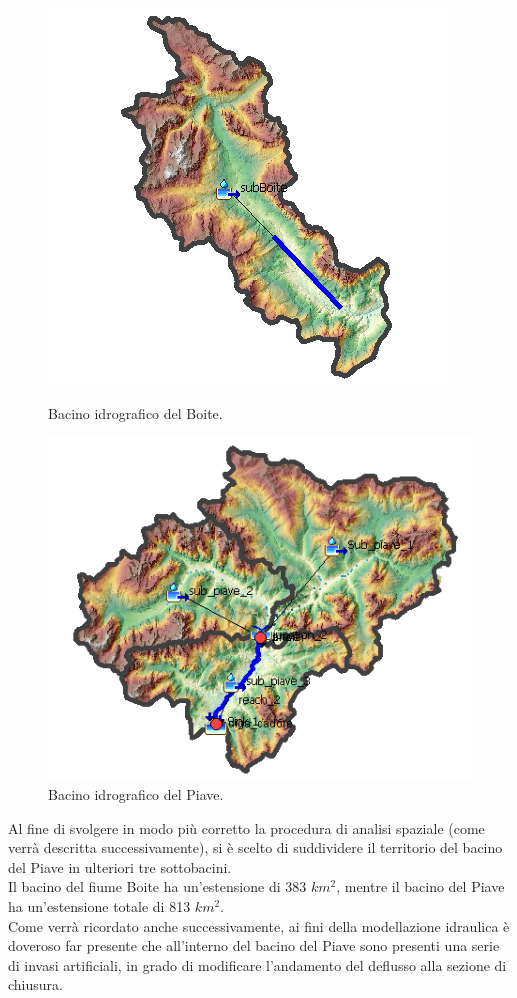 \begin{figure}[H]
    \begin{minipage}[]{7cm}
        \includegraphics[scale=0.73]{immagini/bac_boite.PNG}
        \caption{Bacino idrografico del Boite.}
    \label{bacino_boite}    
    \end{minipage}
        \hspace{2cm}
    \begin{minipage}[]{7cm}
        \includegraphics[scale=0.75]{immagini/bac_piave.PNG}
        \caption{Bacino idrografico del Piave.}
    \label{bacino_piave}
    \end{minipage} 
        \end{figure}

Al fine di svolgere in modo più corretto la procedura di analisi spaziale (come verrà descritta successivamente), si è scelto di suddividere il territorio del bacino del Piave in ulteriori tre sottobacini.\\
Il bacino del fiume Boite ha un'estensione di 383 $km^2$, mentre il bacino del Piave ha un'estensione totale di 813 $km^2$.\\
Come verrà ricordato anche successivamente, ai fini della modellazione idraulica è doveroso far presente che all'interno del bacino del Piave sono presenti una serie di invasi artificiali, in grado di modificare l'andamento del deflusso alla sezione di chiusura.